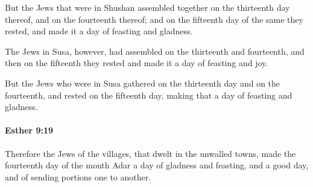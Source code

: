 			\begin{versebox}
					\item[BHS] 
					\item[LXX] 
					\item[ASV] But the Jews that were in Shushan assembled together on the thirteenth day thereof, and on the fourteenth thereof; and on the fifteenth day of the same they rested, and made it a day of feasting and gladness.
					\item[NIV] The Jews in Susa, however, had assembled on the thirteenth and fourteenth, and then on the fifteenth they rested and made it a day of feasting and joy.
					\item[NRSV] But the Jews who were in Susa gathered on the thirteenth day and on the fourteenth, and rested on the fifteenth day, making that a day of feasting and gladness.
			\end{versebox}

		\paragraph{Esther 9:19} %
			\label{ESTHER-9-19}

			Therefore the Jews of the villages, that dwelt in the unwalled towns, made the fourteenth day of the month Adar a day of gladness and feasting, and a good day, and of sending portions one to another.

